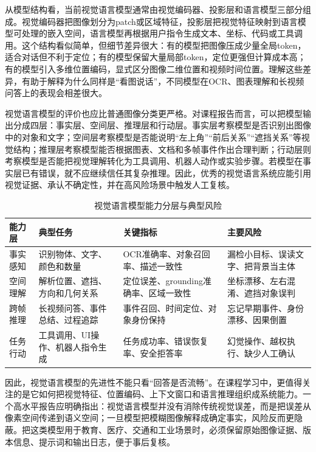 \documentclass[UTF8,a4paper,12pt]{ctexart}
\begin{document}
从模型结构看，当前视觉语言模型通常由视觉编码器、投影层和语言模型三部分组成。视觉编码器把图像划分为patch或区域特征，投影层把视觉特征映射到语言模型可处理的嵌入空间，语言模型再根据用户指令生成文本、坐标、代码或工具调用。这个结构看似简单，但细节差异很大：有的模型把图像压成少量全局token，适合对话但不利于定位；有的模型保留大量局部token，定位更强但计算成本高；有的模型引入多维位置编码，显式区分图像二维位置和视频时间位置。理解这些差异，有助于解释为什么同样是“看图说话”，不同模型在OCR、图表理解和长视频问答上的表现会相差很大。

视觉语言模型的评价也应比普通图像分类更严格。对课程报告而言，可以把模型输出分成四层：事实层、空间层、推理层和行动层。事实层考察模型是否识别出图像中的对象和文字；空间层考察模型是否能说明“左上角”“前后关系”“遮挡关系”等视觉结构；推理层考察模型能否根据图表、文档和多帧事件作出合理判断；行动层则考察模型是否能把视觉理解转化为工具调用、机器人动作或实验步骤。若模型在事实层已有错误，就不应继续信任其复杂推理。因此，优秀的视觉语言系统应能引用视觉证据、承认不确定性，并在高风险场景中触发人工复核。

\begin{table}[htbp]
\centering
\small
\caption{视觉语言模型能力分层与典型风险}
\begin{tabularx}{\textwidth}{C{2.4cm}Y Y Y}
\toprule
\textbf{能力层} & \textbf{典型任务} & \textbf{关键指标} & \textbf{主要风险} \\
\midrule
事实感知 & 识别物体、文字、颜色和数量 & OCR准确率、对象召回率、描述一致性 & 漏检小目标、误读文字、把背景当主体 \\
空间理解 & 解析位置、遮挡、方向和几何关系 & 定位误差、grounding准确率、区域一致性 & 坐标漂移、左右混淆、遮挡对象误判 \\
跨帧推理 & 长视频问答、事件总结、过程追踪 & 事件召回、时间定位、对象身份保持 & 忘记早期事件、身份漂移、因果倒置 \\
任务行动 & 工具调用、UI操作、机器人指令生成 & 任务成功率、错误恢复率、安全拒答率 & 幻觉操作、越权执行、缺少人工确认 \\
\bottomrule
\end{tabularx}
\end{table}

因此，视觉语言模型的先进性不能只看“回答是否流畅”。在课程学习中，更值得关注的是它如何把视觉特征、位置编码、上下文窗口和语言推理组织成系统能力。一个高水平报告应明确指出：视觉语言模型并没有消除传统视觉误差，而是把误差从像素空间传递到语义空间；一旦模型把模糊图像解释成确定事实，风险反而更隐蔽。把这类模型用于教育、医疗、交通和工业场景时，必须保留原始图像证据、版本信息、提示词和输出日志，便于事后复核。
\end{document}
